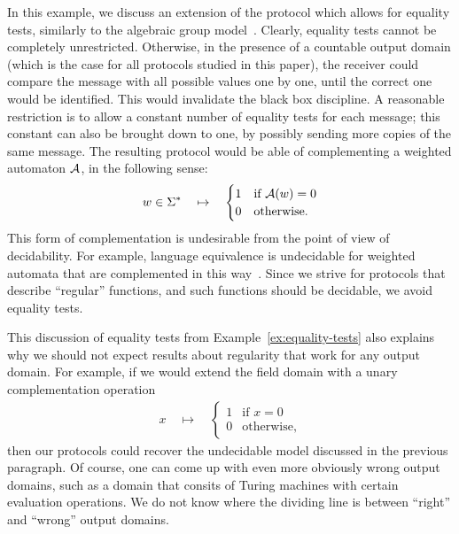 \begin{myexample}
\label{ex:equality-tests} In this example, we discuss an extension of the protocol which allows for equality tests, similarly to the algebraic group model~\cite{fuchsbauer2018algebraic}. Clearly, equality tests cannot be completely unrestricted. Otherwise, in the presence of a countable output domain (which is the case for all protocols studied in this paper), the receiver could compare the message with all possible values one by one, until the correct one would be identified. This would  invalidate the black box discipline. A reasonable restriction is to allow a constant number of equality tests for each message; this constant can also be brought  down to one, by possibly sending more copies of the same message. The resulting protocol would be able of complementing a weighted automaton ${\mathcal A}$, in the following sense:
\begin{align*}
w \in \Sigma^* 
\quad \mapsto \quad 
\begin{cases}
    1 & \text{if ${\mathcal A}(w) =0$}\\
    0 & \text{otherwise}.
\end{cases}
\end{align*}
This form of complementation is undesirable from the point of view of decidability. For example, language equivalence is undecidable for weighted automata that are complemented in this way~\cite[Theorem 4.9]{bojanczyk_automata_2025}. Since we strive for protocols that describe ``regular'' functions, and such functions should be decidable, we avoid equality tests.
\end{myexample}

\begin{myexample}\label{ex:wrong-output-domains}
 This discussion of equality tests from Example~\ref{ex:equality-tests} also explains why we should not expect results about regularity that work for any output domain. For example, if we would extend the field domain with a unary complementation operation 
 \begin{align*}
 x 
 \quad \mapsto \quad 
 \begin{cases}
    1 & \text{if $x =0$}\\
    0 & \text{otherwise},
\end{cases}
 \end{align*}
 then our protocols could recover the undecidable model discussed in the previous paragraph.  Of course, one can come up with even more obviously wrong output domains, such as a domain that consits of Turing machines with certain evaluation operations. We do not know where the dividing line is between ``right'' and ``wrong'' output domains.
\end{myexample}


